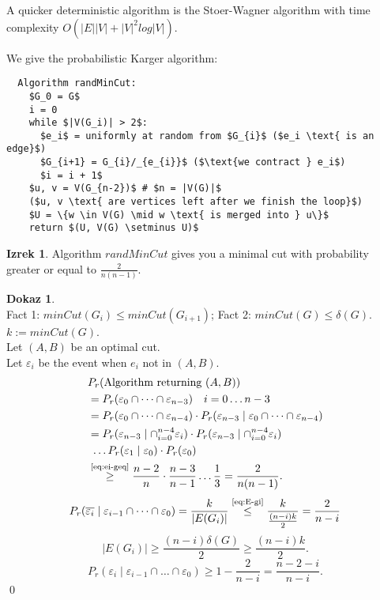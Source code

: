 \documentclass[a4paper, 12pt]{book}
\theoremstyle{definition}
\newtheorem{theorem}[counter]{Izrek}
\newtheorem{pro}[counter]{Dokaz}
\theoremstyle{remark}
\begin{document}
A quicker deterministic algorithm is the Stoer-Wagner algorithm with time complexity $O\left(|E| |V| + |V|^2 log |V|\right)$.

We give the probabilistic Karger algorithm:
\begin{lstlisting}
  Algorithm randMinCut:
    $G_0 = G$
    i = 0
    while $|V(G_i)| > 2$:
      $e_i$ = uniformly at random from $G_{i}$ ($e_i \text{ is an edge}$)
      $G_{i+1} = G_{i}/_{e_{i}}$ ($\text{we contract } e_i$)
      $i = i + 1$
    $u, v = V(G_{n-2})$ # $n = |V(G)|$ 
    ($u, v \text{ are vertices left after we finish the loop}$)
    $U = \{w \in V(G) \mid w \text{ is merged into } u\}$
    return $(U, V(G) \setminus U)$
\end{lstlisting}
\begin{theorem}
  Algorithm $randMinCut$ gives you a minimal cut with probability greater or equal to $\frac{2}{n(n-1)}$.
\end{theorem}
\begin{pro} \text{} \\
  Fact 1: $minCut(G_i) \leq minCut(G_{i+1})$;
  Fact 2: $minCut(G) \leq \delta(G)$. \\
  $k := minCut(G)$. \\
  Let $(A,B)$ be an optimal cut. \\
  Let $\varepsilon_i$ be the event when $e_i$ not in $(A,B)$.
  \begin{align}
    &P_r(\text{Algorithm returning } (A,B)) \nonumber \\
    &= P_r(\varepsilon_0 \cap \dots \cap \varepsilon_{n-3}) \quad i = 0 \dots n-3 \nonumber  \\
    &= P_r(\varepsilon_0 \cap \dots \cap \varepsilon_{n-4}) \cdot
      P_r(\varepsilon_{n-3} \mid \varepsilon_0 \cap \dots \cap \varepsilon_{n-4}) \nonumber  \\
    &= P_r(\varepsilon_{n-3} \mid \cap_{i=0}^{n-4} \varepsilon_i) \cdot
      P_r(\varepsilon_{n-3} \mid \cap_{i=0}^{n-4} \varepsilon_i) \nonumber \\
    &\text{ } \dots P_r(\varepsilon_1 \mid \varepsilon_0) \cdot P_r(\varepsilon_0) \nonumber \\
    &\stackrel{\refeq{eq:ei-geq}}{\geq} \frac{n-2}{n} \cdot \frac{n-3}{n-1} \dots \frac{1}{3} = \frac{2}{n(n-1)}. \nonumber
  \end{align}
  \begin{equation*}
    P_r(\overline{\varepsilon_i} \mid \varepsilon_{i-1} \cap \dots \cap \varepsilon_0) =
      \frac{k}{|E(G_i)|} \stackrel{\refeq{eq:E-gi}}{\leq} \frac{k}{\frac{(n-i)k}{2}} = \frac{2}{n-i}
  \end{equation*}
  \begin{equation}
    \label{eq:E-gi}
    |E(G_i)| \geq \frac{(n-i) \delta(G)}{2} \geq \frac{(n-i)k}{2}.
  \end{equation}
  \begin{equation}
    \label{eq:ei-geq}
    P_r(\varepsilon_i \mid \varepsilon_{i-1} \cap \dots \cap \varepsilon_0) \geq 1 - \frac{2}{n-i} = \frac{n-2-i}{n-i}.
  \end{equation}
  \qed
\end{pro}
\end{document}
